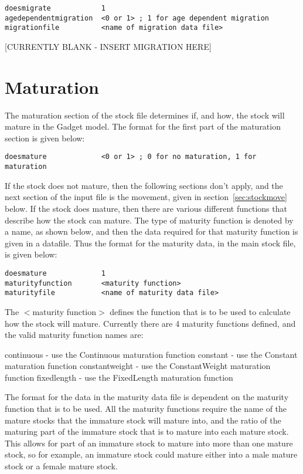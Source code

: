 \documentclass [a4paper, 10pt]{book}
\begin{document}
{\small\begin{verbatim}
doesmigrate            1
agedependentmigration  <0 or 1> ; 1 for age dependent migration
migrationfile          <name of migration data file>
\end{verbatim}}

[CURRENTLY BLANK - INSERT MIGRATION HERE]

\section{Maturation}\label{sec:stockmature}
The maturation section of the stock file determines if, and how, the stock will mature in the Gadget model. The format for the first part of the maturation section is given below:

{\small\begin{verbatim}
doesmature             <0 or 1> ; 0 for no maturation, 1 for maturation
\end{verbatim}}

If the stock does not mature, then the following sections don't apply, and the next section of the input file is the movement, given in section~\ref{sec:stockmove} below.  If the stock does mature, then there are various different functions that describe how the stock can mature.  The type of maturity function is denoted by a name, as shown below, and then the data required for that maturity function is given in a datafile.  Thus the format for the maturity data, in the main stock file, is given below:

{\small\begin{verbatim}
doesmature             1
maturityfunction       <maturity function>
maturityfile           <name of maturity data file>
\end{verbatim}}

The $<$maturity function$>$ defines the function that is to be used to calculate how the stock will mature.  Currently there are 4 maturity functions defined, and the valid maturity function names are:

\bigskip
continuous - use the Continuous maturation function\newline
constant - use the Constant maturation function\newline
constantweight - use the ConstantWeight maturation function\newline
fixedlength - use the FixedLength maturation function

\bigskip
The format for the data in the maturity data file is dependent on the maturity function that is to be used.  All the maturity functions require the name of the mature stocks that the immature stock will mature into, and the ratio of the maturing part of the immature stock that is to mature into each mature stock.  This allows for part of an immature stock to mature into more than one mature stock, so for example, an immature stock could mature either into a male mature stock or a female mature stock.
\end{document}
